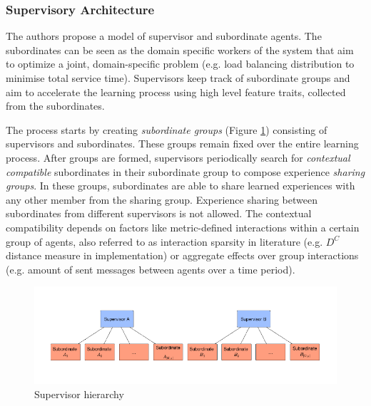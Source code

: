 \documentclass[letterpaper]{article}
\begin{document}
\subsubsection{Supervisory Architecture}
The authors propose a model of supervisor and subordinate agents. The subordinates can be seen as the domain specific workers of the system that aim to optimize a joint, domain-specific problem (e.g. load balancing distribution to minimise total service time). Supervisors keep track of subordinate groups and aim to accelerate the learning process using high level feature traits, collected from the subordinates.

The process starts by creating \textit{subordinate groups} (Figure \ref{fig:subordinate}) consisting of supervisors and subordinates. These groups remain fixed over the entire learning process. After groups are formed, supervisors periodically search for \textit{contextual compatible} subordinates in their subordinate group to compose experience \textit{sharing groups}. In these groups, subordinates are able to share learned experiences with any other member from the sharing group. Experience sharing between subordinates from different supervisors is not allowed. The contextual compatibility depends on factors like metric-defined interactions within a certain group of agents, also referred to as interaction sparsity in literature (e.g. $D^C$ distance measure in implementation) or aggregate effects over group interactions (e.g. amount of sent messages between agents over a time period).
\begin{figure}[ht]
 \begin{center}
  \includegraphics[width=\linewidth]{figures/subordinates}
  \caption{Supervisor hierarchy \citep{garant2015accelerating}}
  \label{fig:subordinate}
 \end{center}
\end{figure}
\end{document}
